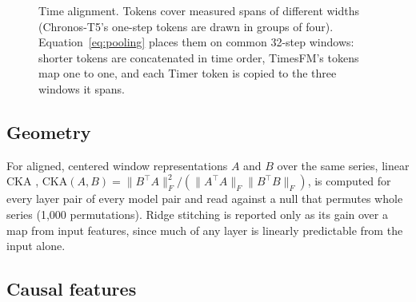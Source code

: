 \begin{figure}[!tb]
\centering
{}
\caption{Time alignment. Tokens cover measured spans of different widths (Chronos-T5's one-step tokens are drawn in
groups of four). Equation~\eqref{eq:pooling} places them on common 32-step windows: shorter tokens are concatenated in
time order, TimesFM's tokens map one to one, and each Timer token is copied to the three windows it spans.}
\label{fig:alignment}
\end{figure}

\subsection{Geometry}

For aligned, centered window representations $A$ and $B$ over the same series, linear CKA \citep{kornblith2019cka},
$\mathrm{CKA}(A,B)=\|B^{\top}A\|_F^2/(\|A^{\top}A\|_F\|B^{\top}B\|_F)$, is computed for every layer pair of every model
pair and read against a null that permutes whole series (1{,}000 permutations). Ridge stitching
\citep{bansal2021stitching} is reported only as its gain over a map from input features, since much of any layer is
linearly predictable from the input alone.

\subsection{Causal features}
\label{sec:causal}

